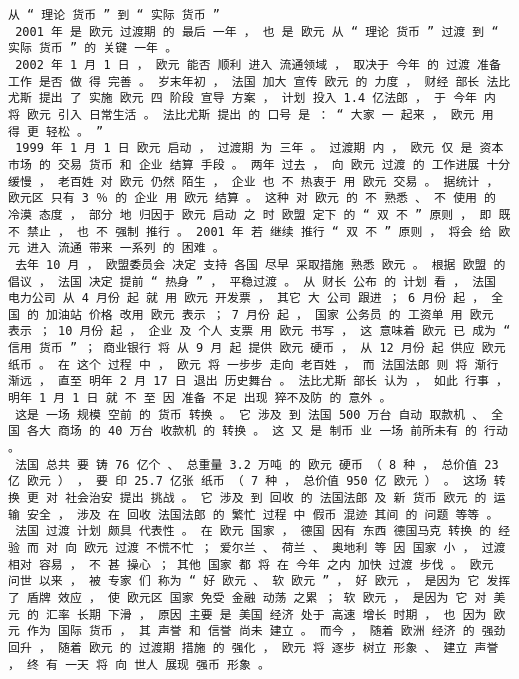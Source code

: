 \documentclass{article}
\begin{document}
\begin{Verbatim}[commandchars=\\\{\}]
 从 “ 理论 货币 ” 到 “ 实际 货币 ” 
 2001 年 是 欧元 过渡期 的 最后 一年 ， 也 是 欧元 从 “ 理论 货币 ” 过渡 到 “ 实际 货币 ” 的 关键 一年 。 
 2002 年 1 月 1 日 ， 欧元 能否 顺利 进入 流通领域 ， 取决于 今年 的 过渡 准备 工作 是否 做 得 完善 。 岁末年初 ， 法国 加大 宣传 欧元 的 力度 ， 财经 部长 法比尤斯 提出 了 实施 欧元 四 阶段 宣导 方案 ， 计划 投入 1.4 亿法郎 ， 于 今年 内 将 欧元 引入 日常生活 。 法比尤斯 提出 的 口号 是 ： “ 大家 一 起来 ， 欧元 用 得 更 轻松 。 ” 
 1999 年 1 月 1 日 欧元 启动 ， 过渡期 为 三年 。 过渡期 内 ， 欧元 仅 是 资本 市场 的 交易 货币 和 企业 结算 手段 。 两年 过去 ， 向 欧元 过渡 的 工作进展 十分 缓慢 ， 老百姓 对 欧元 仍然 陌生 ， 企业 也 不 热衷于 用 欧元 交易 。 据统计 ， 欧元区 只有 3 ％ 的 企业 用 欧元 结算 。 这种 对 欧元 的 不 熟悉 、 不 使用 的 冷漠 态度 ， 部分 地 归因于 欧元 启动 之 时 欧盟 定下 的 “ 双 不 ” 原则 ， 即 既 不 禁止 ， 也 不 强制 推行 。 2001 年 若 继续 推行 “ 双 不 ” 原则 ， 将会 给 欧元 进入 流通 带来 一系列 的 困难 。 
 去年 10 月 ， 欧盟委员会 决定 支持 各国 尽早 采取措施 熟悉 欧元 。 根据 欧盟 的 倡议 ， 法国 决定 提前 “ 热身 ” ， 平稳过渡 。 从 财长 公布 的 计划 看 ， 法国 电力公司 从 4 月份 起 就 用 欧元 开发票 ， 其它 大 公司 跟进 ； 6 月份 起 ， 全国 的 加油站 价格 改用 欧元 表示 ； 7 月份 起 ， 国家 公务员 的 工资单 用 欧元 表示 ； 10 月份 起 ， 企业 及 个人 支票 用 欧元 书写 ， 这 意味着 欧元 已 成为 “ 信用 货币 ” ； 商业银行 将 从 9 月 起 提供 欧元 硬币 ， 从 12 月份 起 供应 欧元 纸币 。 在 这个 过程 中 ， 欧元 将 一步步 走向 老百姓 ， 而 法国法郎 则 将 渐行 渐远 ， 直至 明年 2 月 17 日 退出 历史舞台 。 法比尤斯 部长 认为 ， 如此 行事 ， 明年 1 月 1 日 就 不 至 因 准备 不足 出现 猝不及防 的 意外 。 
 这是 一场 规模 空前 的 货币 转换 。 它 涉及 到 法国 500 万台 自动 取款机 、 全国 各大 商场 的 40 万台 收款机 的 转换 。 这 又 是 制币 业 一场 前所未有 的 行动 。 
 法国 总共 要 铸 76 亿个 、 总重量 3.2 万吨 的 欧元 硬币 （ 8 种 ， 总价值 23 亿 欧元 ） ， 要 印 25.7 亿张 纸币 （ 7 种 ， 总价值 950 亿 欧元 ） 。 这场 转换 更 对 社会治安 提出 挑战 。 它 涉及 到 回收 的 法国法郎 及 新 货币 欧元 的 运输 安全 ， 涉及 在 回收 法国法郎 的 繁忙 过程 中 假币 混迹 其间 的 问题 等等 。 
 法国 过渡 计划 颇具 代表性 。 在 欧元 国家 ， 德国 因有 东西 德国马克 转换 的 经验 而 对 向 欧元 过渡 不慌不忙 ； 爱尔兰 、 荷兰 、 奥地利 等 因 国家 小 ， 过渡 相对 容易 ， 不 甚 操心 ； 其他 国家 都 将 在 今年 之内 加快 过渡 步伐 。 欧元 问世 以来 ， 被 专家 们 称为 “ 好 欧元 、 软 欧元 ” ， 好 欧元 ， 是因为 它 发挥 了 盾牌 效应 ， 使 欧元区 国家 免受 金融 动荡 之累 ； 软 欧元 ， 是因为 它 对 美元 的 汇率 长期 下滑 ， 原因 主要 是 美国 经济 处于 高速 增长 时期 ， 也 因为 欧元 作为 国际 货币 ， 其 声誉 和 信誉 尚未 建立 。 而今 ， 随着 欧洲 经济 的 强劲 回升 ， 随着 欧元 的 过渡期 措施 的 强化 ， 欧元 将 逐步 树立 形象 、 建立 声誉 ， 终 有 一天 将 向 世人 展现 强币 形象 。 

\end{Verbatim}
\end{document}
